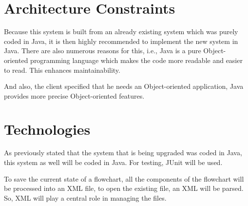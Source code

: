 \section{Architecture Constraints}

Because this system is built from an already existing system which was purely coded in Java, it is then highly recommended to implement the new system in Java. There are also numerous reasons for this, i.e., Java is a pure Object-oriented programming language which makes the code more readable and easier to read. This enhances maintainability.\newline

And also, the client specified that he needs an Object-oriented application, Java provides more precise Object-oriented features.

\section{Technologies}

As previously stated that the system that is being upgraded was coded in Java, this system as well will be coded in Java.
For testing, JUnit will be used. \newline

To save the current state of a flowchart, all the components of the flowchart will be processed into an XML file, to open the existing file, an XML will be parsed. So, XML will play a central role in managing the files.







